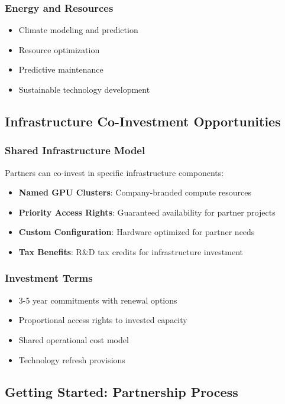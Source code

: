 \subsubsection{Energy and Resources}
\begin{itemize}
\item Climate modeling and prediction
\item Resource optimization
\item Predictive maintenance
\item Sustainable technology development
\end{itemize}

\subsection{Infrastructure Co-Investment Opportunities}

\subsubsection{Shared Infrastructure Model}
Partners can co-invest in specific infrastructure components:
\begin{itemize}
\item \textbf{Named GPU Clusters}: Company-branded compute resources
\item \textbf{Priority Access Rights}: Guaranteed availability for partner projects
\item \textbf{Custom Configuration}: Hardware optimized for partner needs
\item \textbf{Tax Benefits}: R\&D tax credits for infrastructure investment
\end{itemize}

\subsubsection{Investment Terms}
\begin{itemize}
\item 3-5 year commitments with renewal options
\item Proportional access rights to invested capacity
\item Shared operational cost model
\item Technology refresh provisions
\end{itemize}

\subsection{Getting Started: Partnership Process}

